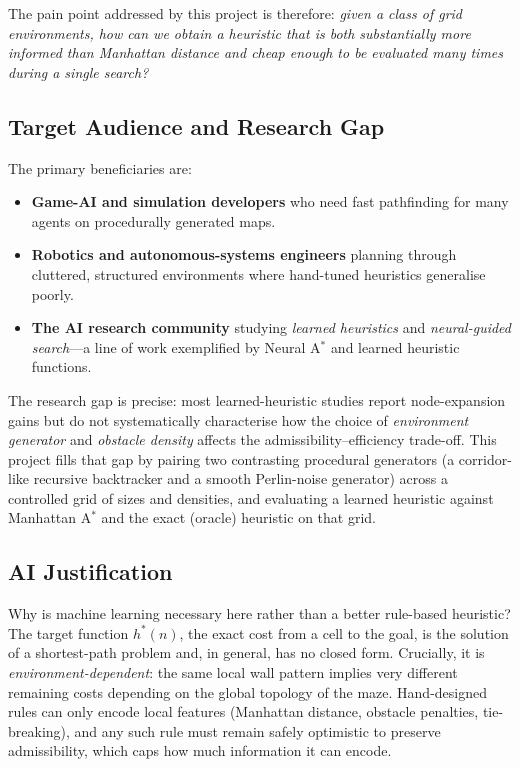 \documentclass[11pt]{article}
\begin{document}
The pain point addressed by this project is therefore: \emph{given a class of grid
environments, how can we obtain a heuristic that is both substantially more informed
than Manhattan distance and cheap enough to be evaluated many times during a single
search?}

\subsection{Target Audience and Research Gap}
The primary beneficiaries are:

\begin{itemize}
  \item \textbf{Game-AI and simulation developers} who need fast pathfinding for many
  agents on procedurally generated maps.
  \item \textbf{Robotics and autonomous-systems engineers} planning through cluttered,
  structured environments where hand-tuned heuristics generalise poorly.
  \item \textbf{The AI research community} studying \emph{learned heuristics} and
  \emph{neural-guided search}---a line of work exemplified by Neural A$^\ast$
  \cite{yonetani2021} and learned heuristic functions.
\end{itemize}

The research gap is precise: most learned-heuristic studies report node-expansion gains
but do not systematically characterise how the choice of \emph{environment generator}
and \emph{obstacle density} affects the admissibility--efficiency trade-off. This project
fills that gap by pairing two contrasting procedural generators (a corridor-like
recursive backtracker and a smooth Perlin-noise generator) across a controlled grid of
sizes and densities, and evaluating a learned heuristic against Manhattan A$^\ast$ and
the exact (oracle) heuristic on that grid.

\subsection{AI Justification}
Why is machine learning necessary here rather than a better rule-based heuristic? The
target function $h^\ast(n)$, the exact cost from a cell to the goal, is the solution of a
shortest-path problem and, in general, has no closed form. Crucially, it is
\emph{environment-dependent}: the same local wall pattern implies very different
remaining costs depending on the global topology of the maze. Hand-designed rules can
only encode local features (Manhattan distance, obstacle penalties, tie-breaking), and
any such rule must remain safely optimistic to preserve admissibility, which caps how
much information it can encode.
\end{document}
